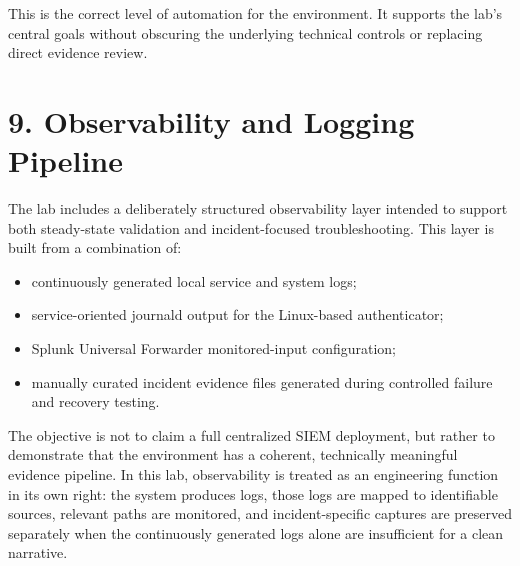 \documentclass[11pt]{article}
\begin{document}
This is the correct level of automation for the environment. It supports the lab's central goals without obscuring the underlying technical controls or replacing direct evidence review.


\section{9. Observability and Logging Pipeline}
\label{sec:observability-and-logging-pipeline}

The lab includes a deliberately structured observability layer intended to support both steady-state validation and incident-focused troubleshooting. This layer is built from a combination of:

\begin{itemize}
    \item continuously generated local service and system logs;
    \item service-oriented journald output for the Linux-based authenticator;
    \item Splunk Universal Forwarder monitored-input configuration;
    \item manually curated incident evidence files generated during controlled failure and recovery testing.
\end{itemize}

The objective is not to claim a full centralized SIEM deployment, but rather to demonstrate that the environment has a coherent, technically meaningful evidence pipeline. In this lab, observability is treated as an engineering function in its own right: the system produces logs, those logs are mapped to identifiable sources, relevant paths are monitored, and incident-specific captures are preserved separately when the continuously generated logs alone are insufficient for a clean narrative.

\end{document}
